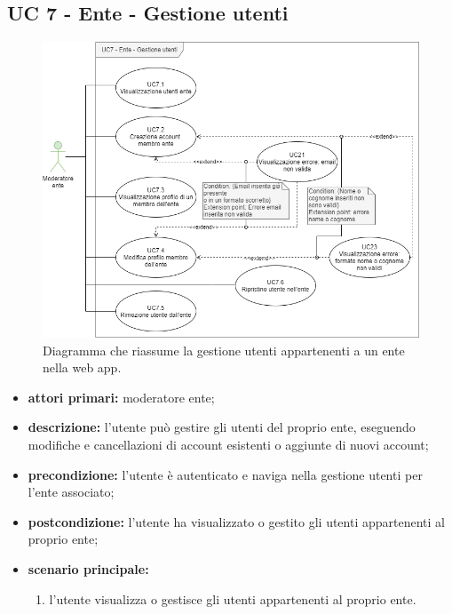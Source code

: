 	\subsection{UC 7 - Ente - Gestione utenti}

		\begin{figure}[H]
			\centering
			\includegraphics[scale=0.60]{res/images/uc7}
			\caption{Diagramma che riassume la gestione utenti appartenenti a un ente nella web app.}
		\end{figure}

		\begin{itemize}
			\item \textbf{attori primari:} moderatore ente;
			\item \textbf{descrizione:} l'utente può gestire gli utenti del proprio ente, eseguendo modifiche e cancellazioni di account esistenti o aggiunte di nuovi account;
			\item \textbf{precondizione:} l'utente è autenticato e naviga nella gestione utenti per l'ente associato;
			\item \textbf{postcondizione:} l'utente ha visualizzato o gestito gli utenti appartenenti al proprio ente;
			\item \textbf{scenario principale:}
			\begin{enumerate}
				\item{l'utente visualizza o gestisce gli utenti appartenenti al proprio ente.}
			\end{enumerate}
		\end{itemize}

